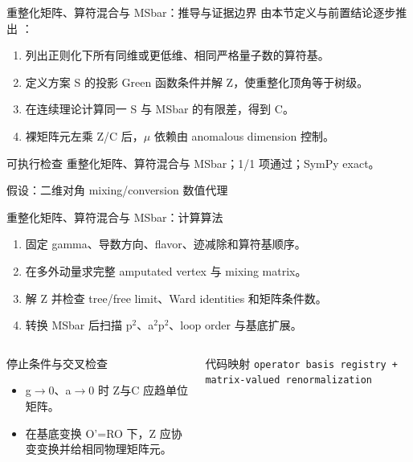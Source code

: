 \begin{frame}[t]{重整化矩阵、算符混合与 MSbar：推导与证据边界}
\footnotesize
{}\quad 由本节定义与前置结论逐步推出 ：
\begin{enumerate}
\item 列出正则化下所有同维或更低维、相同严格量子数的算符基。
\item 定义方案 S 的投影 Green 函数条件并解 Z，使重整化顶角等于树级。
\item 在连续理论计算同一 S 与 MSbar 的有限差，得到 C。
\item 裸矩阵元左乘 Z/\allowbreak{}C 后，\ensuremath{\mu} 依赖由 anomalous dimension 控制。
\end{enumerate}\begin{block}{可执行检查}
\quad 重整化矩阵、算符混合与 MSbar；1/1 项通过；SymPy exact。
\par\scriptsize 假设：二维对角 mixing/\allowbreak{}conversion 数值代理
\end{block}
\end{frame}

\begin{frame}[t]{重整化矩阵、算符混合与 MSbar：计算算法}
\footnotesize
{}\begin{enumerate}
\item 固定 gamma、导数方向、flavor、迹减除和算符基顺序。
\item 在多外动量求完整 amputated vertex 与 mixing matrix。
\item 解 Z 并检查 tree/\allowbreak{}free limit、Ward identities 和矩阵条件数。
\item 转换 MSbar 后扫描 p\ensuremath{^{2}}、a\ensuremath{^{2}}p\ensuremath{^{2}}、loop order 与基底扩展。
\end{enumerate}\begin{columns}[T,onlytextwidth]
\begin{block}{停止条件与交叉检查}\scriptsize\begin{itemize}
\item[\CheckMark] g\ensuremath{\rightarrow}0、a\ensuremath{\rightarrow}0 时 Z与C 应趋单位矩阵。
\item[\CheckMark] 在基底变换 O'=RO 下，Z 应协变变换并给相同物理矩阵元。
\end{itemize}\end{block}
\begin{block}{代码映射}
\scriptsize \texttt{operator basis registry + matrix-valued renormalization}
\end{block}\end{columns}\end{frame}


